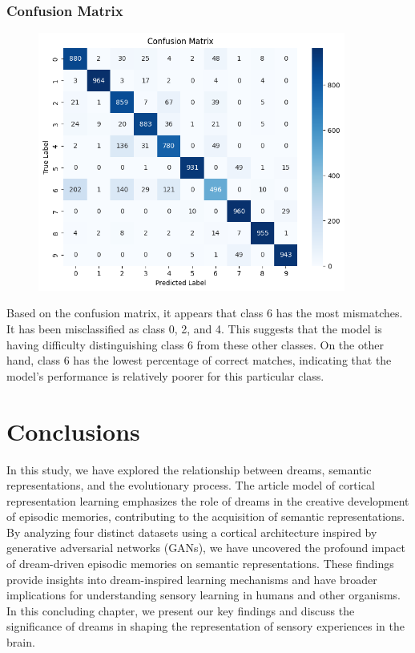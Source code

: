 \documentclass{midl} %
\begin{document}
\subsubsection{Confusion Matrix}
\begin{figure}[H]
\centering
\includegraphics[width=0.9\textwidth]{confusion_matrix_fashion.png}\hfill
\end{figure}
Based on the confusion matrix, it appears that class 6 has the most mismatches. It has been misclassified as class 0, 2, and 4. This suggests that the model is having difficulty distinguishing class 6 from these other classes. On the other hand, class 6 has the lowest percentage of correct matches, indicating that the model's performance is relatively poorer for this particular class.


\section{Conclusions}
In this study, we have explored the relationship between dreams, semantic representations, and the evolutionary process. The article model of cortical representation learning emphasizes the role of dreams in the creative development of episodic memories, contributing to the acquisition of semantic representations. By analyzing four distinct datasets using a cortical architecture inspired by generative adversarial networks (GANs), we have uncovered the profound impact of dream-driven episodic memories on semantic representations. These findings provide insights into dream-inspired learning mechanisms and have broader implications for understanding sensory learning in humans and other organisms. In this concluding chapter, we present our key findings and discuss the significance of dreams in shaping the representation of sensory experiences in the brain.
\end{document}
